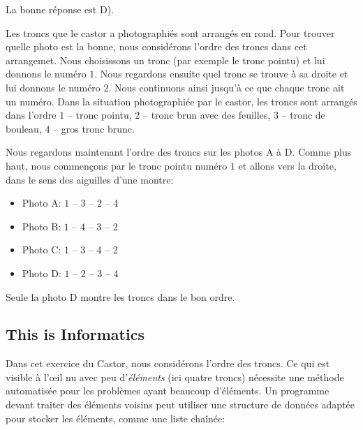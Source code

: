 \documentclass[a4paper,11pt]{report}
\newcommand{\taskGraphicsFolder}{..}
\begin{document}
La bonne réponse est D). \raisebox{-0.5ex}{}

Les troncs que le castor a photographiés sont arrangés en rond. Pour trouver quelle photo est la bonne, nous considérons l’ordre des troncs dans cet arrangemet. Nous choisissons un tronc (par exemple le tronc pointu) et lui donnons le numéro $1$. Nous regardons ensuite quel tronc se trouve à sa droite et lui donnons le numéro $2$. Nous continuons ainsi jusqu’à ce que chaque tronc ait un numéro. Dans la situation photographiée par le castor, les troncs sont arrangés dans l’ordre $1$ – tronc pointu, $2$ – tronc brun avec des feuilles, $3$ – tronc de bouleau, $4$ – gros tronc brunc.

{\centering%
\par}

Nous regardons maintenant l’ordre des troncs sur les photos A à D. Comme plus haut, nous commençons par le tronc pointu numéro $1$ et allons vers la droite, dans le sens des aiguilles d’une montre:

\begin{itemize}
  \item Photo A: $1$ – $3$ – $2$ – 4
  \item Photo B: $1$ – $4$ – $3$ – 2
  \item Photo C: $1$ – $3$ – $4$ – 2
  \item Photo D: $1$ – $2$ – $3$ – 4
\end{itemize}

Seule la photo D montre les troncs dans le bon ordre.

{\centering%
\par}


\subsection*{This is Informatics}

Dans cet exercice du Castor, nous considérons l’ordre des troncs. Ce qui est visible à l’œil nu avec peu d’\emph{éléments} (ici quatre troncs) nécessite une méthode automatisée pour les problèmes ayant beaucoup d’éléments. Un programme devant traiter des éléments voisins peut utiliser une structure de données adaptée pour stocker les éléments, comme une liste chaînée:

{\centering%
\par}
\end{document}
